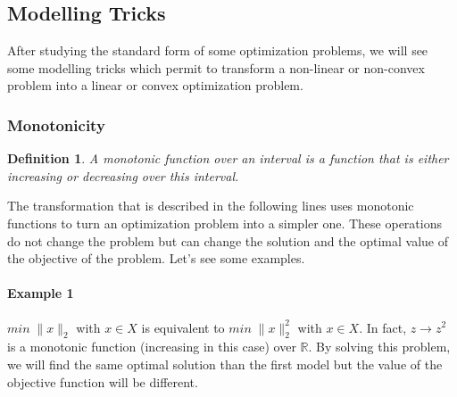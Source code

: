 %
%
%
%

\subsection{Modelling Tricks}

After studying the standard form of some optimization problems, we will see some modelling tricks which permit to transform a non-linear or non-convex problem into a linear or convex optimization problem. 

\subsubsection{Monotonicity}

\newtheorem{mydef}{Definition}
\begin{mydef}
A monotonic function over an interval is a function that is either increasing or decreasing over this interval.
\end{mydef}

The transformation that is described in the following lines uses monotonic functions to turn an optimization problem into a simpler one. These operations do not change the problem but can change the solution and the optimal value of the objective of the problem. Let's see some examples. \\ 

\paragraph{Example 1}
$min \; \|x\|_{2}$ with $x \in X$ is equivalent to $min \; \|x\|_{2}^{2}$ with $x \in X$. In fact, $z \rightarrow z^2$ is a monotonic function (increasing in this case) over $\mathbb{R}$. By solving this problem, we will find the same optimal solution than the first model but the value of the objective function will be different. \\


